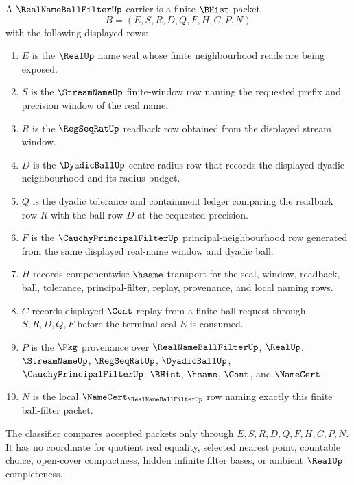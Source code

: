 \begin{definition}
\label{def:real-name-ball-filter-carrier}
A $\RealNameBallFilterUp$ carrier is a finite $\BHist$ packet
$$
B=(E,S,R,D,Q,F,H,C,P,N)
$$
with the following displayed rows:
\begin{enumerate}
\item $E$ is the $\RealUp$ name seal whose finite neighbourhood reads are being exposed.
\item $S$ is the $\StreamNameUp$ finite-window row naming the requested prefix and precision window of the real name.
\item $R$ is the $\RegSeqRatUp$ readback row obtained from the displayed stream window.
\item $D$ is the $\DyadicBallUp$ centre-radius row that records the displayed dyadic neighbourhood and its radius budget.
\item $Q$ is the dyadic tolerance and containment ledger comparing the readback row $R$ with the ball row $D$ at the requested precision.
\item $F$ is the $\CauchyPrincipalFilterUp$ principal-neighbourhood row generated from the same displayed real-name window and dyadic ball.
\item $H$ records componentwise $\hsame$ transport for the seal, window, readback, ball, tolerance, principal-filter, replay, provenance, and local naming rows.
\item $C$ records displayed $\Cont$ replay from a finite ball request through $S,R,D,Q,F$ before the terminal seal $E$ is consumed.
\item $P$ is the $\Pkg$ provenance over $\RealNameBallFilterUp$, $\RealUp$, $\StreamNameUp$, $\RegSeqRatUp$, $\DyadicBallUp$, $\CauchyPrincipalFilterUp$, $\BHist$, $\hsame$, $\Cont$, and $\NameCert$.
\item $N$ is the local $\NameCert_{\RealNameBallFilterUp}$ row naming exactly this finite ball-filter packet.
\end{enumerate}
The classifier compares accepted packets only through $E,S,R,D,Q,F,H,C,P,N$. It has no coordinate for quotient real equality, selected nearest point, countable choice, open-cover compactness, hidden infinite filter bases, or ambient $\RealUp$ completeness.
\end{definition}

